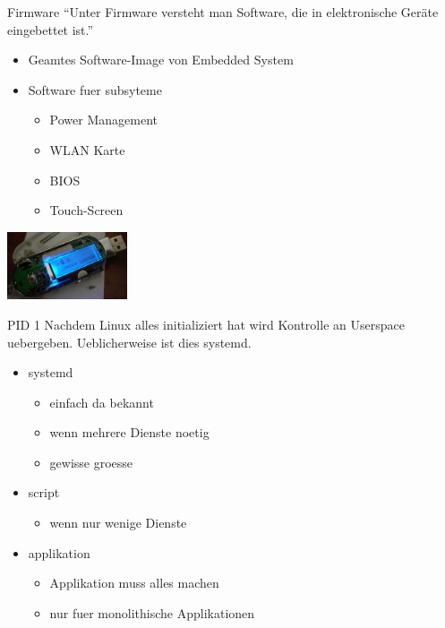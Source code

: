 



\begin{frame}{Firmware}
	``Unter Firmware versteht man Software, die in elektronische Geräte eingebettet ist.'' \cite{wikiFirmware}
	
	\begin{itemize}
		\item Geamtes Software-Image von Embedded System
		\item Software fuer subsyteme
		\begin{itemize}
			\item Power Management
			\item WLAN Karte
			\item BIOS
			\item Touch-Screen
		\end{itemize}
	\end{itemize}
	
	\includegraphics[height=2cm]{res/Firmware_upgrade.jpg} \cite{firmwareUpgrade}
\end{frame}

\begin{frame}{PID 1}
	Nachdem Linux alles initializiert hat wird Kontrolle an Userspace uebergeben.
	Ueblicherweise ist dies systemd.
	\begin{itemize}
		\item systemd
		\begin{itemize}
			\item einfach da bekannt
			\item wenn mehrere Dienste noetig
			\item gewisse groesse
		\end{itemize}
		\item script
		\begin{itemize}
			\item wenn nur wenige Dienste
		\end{itemize}
		\item applikation
		\begin{itemize}
			\item Applikation muss alles machen
			\item nur fuer monolithische Applikationen
		\end{itemize}
	\end{itemize}
\end{frame}

